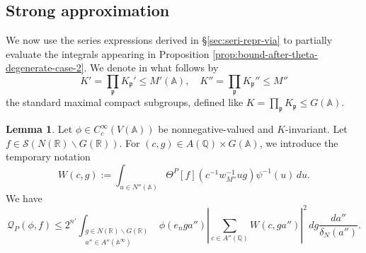 \documentclass[reqno]{amsart}
\theoremstyle{plain} \newtheorem{theorem} {Theorem}
\theoremstyle{definition} \newtheorem{definition} [theorem] {Definition}
\theoremstyle{itplain} %
\newtheorem{lemma}[theorem]{Lemma}
\numberwithin{equation}{section}
\numberwithin{theorem}{section}
\renewcommand{\leq}{\leqslant}
\begin{document}
\subsection{Strong approximation}\label{sec:strong-approximation}
We now use the series expressions derived in \S\ref{sec:seri-repr-via} to partially evaluate the integrals appearing in Proposition \ref{prop:bound-after-theta-degenerate-case-2}.  We denote in what follows by
\begin{equation*}
  K'  = \prod_\mathfrak{p} K_\mathfrak{p} ' \leq M'(\mathbb{A}), \quad K'' = \prod_\mathfrak{p} K_\mathfrak{p} '' \leq M''
\end{equation*}
the standard maximal compact subgroups, defined like $K =\prod_\mathfrak{p} K_\mathfrak{p} \leq G(\mathbb{A})$.
\begin{lemma}\label{lem:sub-gln:let-phi-in}
  Let $\phi \in C_c^\infty(V(\mathbb{A}))$ be nonnegative-valued and $K$-invariant.  Let $f \in \mathcal{S}(N(\mathbb{R}) \backslash G(\mathbb{R}))$.  For $(c,g) \in A(\mathbb{Q}) \times G(\mathbb{A})$, we introduce the temporary notation
\begin{equation*}
  W(c,g) := \int _{u \in N''(\mathbb{A})} \Theta^P[f](c^{-1} w_{M''}^{-1} u g) \psi^{-1} (u) \, d u.
\end{equation*}
We have
\begin{equation}\label{eq:mathc-f_infty-leq}
  \mathcal{Q}_P(\phi,f)
    \leq
    2^{n'}
  \int _{
    \substack{
      g \in N(\mathbb{R}) \backslash G(\mathbb{R}) \\
      a'' \in A''(\mathbb{A}^\infty)
    }
  } 
  \phi(e_n g a'')
  \left\lvert
    \sum _{c \in A''(\mathbb{Q})}
    W(c,g a'')
  \right\rvert^2
  \, d g \frac{d a''}{\delta_N(a'')}.
\end{equation}
\end{lemma}
\end{document}
